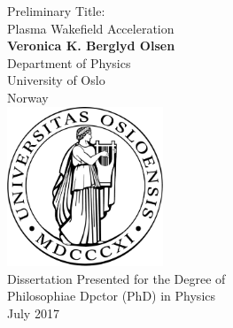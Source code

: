\begin{titlepage}
    \begin{center}
        \vspace*{10mm}
        \huge{}
        Preliminary Title:\\
        Plasma Wakefield Acceleration\\
        \vspace{20mm}
        \large
        \textbf{Veronica K. Berglyd Olsen}\\
        Department of Physics\\
        University of Oslo\\
        Norway\\
        \vfill
        \includegraphics[width=0.35\textwidth]{images/UiOLogo.pdf}\\
        \vspace{20mm}
        Dissertation Presented for the Degree of\\
        Philosophiae Dpctor (PhD) in Physics\\
        \vspace{10mm}
        \large{July 2017}
    \end{center}
\end{titlepage}
